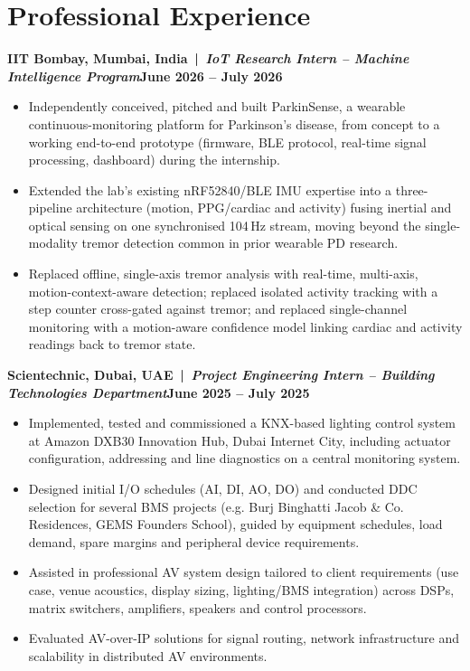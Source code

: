 \documentclass[10pt,letterpaper]{article}
\newcommand{\role}[2]{\par\vspace{4pt}\textbf{#1}\hfill\textbf{#2}\par}
\begin{document}
\section{Professional Experience}
\role{IIT Bombay, Mumbai, India \,|\, \textit{IoT Research Intern -- Machine Intelligence Program}}{June 2026 -- July 2026}
\begin{itemize}
\item Independently conceived, pitched and built ParkinSense, a wearable continuous-monitoring platform for Parkinson's disease, from concept to a working end-to-end prototype (firmware, BLE protocol, real-time signal processing, dashboard) during the internship.
\item Extended the lab's existing nRF52840/BLE IMU expertise into a three-pipeline architecture (motion, PPG/cardiac and activity) fusing inertial and optical sensing on one synchronised 104\,Hz stream, moving beyond the single-modality tremor detection common in prior wearable PD research.
\item Replaced offline, single-axis tremor analysis with real-time, multi-axis, motion-context-aware detection; replaced isolated activity tracking with a step counter cross-gated against tremor; and replaced single-channel monitoring with a motion-aware confidence model linking cardiac and activity readings back to tremor state.
\end{itemize}

\role{Scientechnic, Dubai, UAE \,|\, \textit{Project Engineering Intern -- Building Technologies Department}}{June 2025 -- July 2025}
\begin{itemize}
\item Implemented, tested and commissioned a KNX-based lighting control system at Amazon DXB30 Innovation Hub, Dubai Internet City, including actuator configuration, addressing and line diagnostics on a central monitoring system.
\item Designed initial I/O schedules (AI, DI, AO, DO) and conducted DDC selection for several BMS projects (e.g. Burj Binghatti Jacob \& Co. Residences, GEMS Founders School), guided by equipment schedules, load demand, spare margins and peripheral device requirements.
\item Assisted in professional AV system design tailored to client requirements (use case, venue acoustics, display sizing, lighting/BMS integration) across DSPs, matrix switchers, amplifiers, speakers and control processors.
\item Evaluated AV-over-IP solutions for signal routing, network infrastructure and scalability in distributed AV environments.
\end{itemize}
\end{document}

